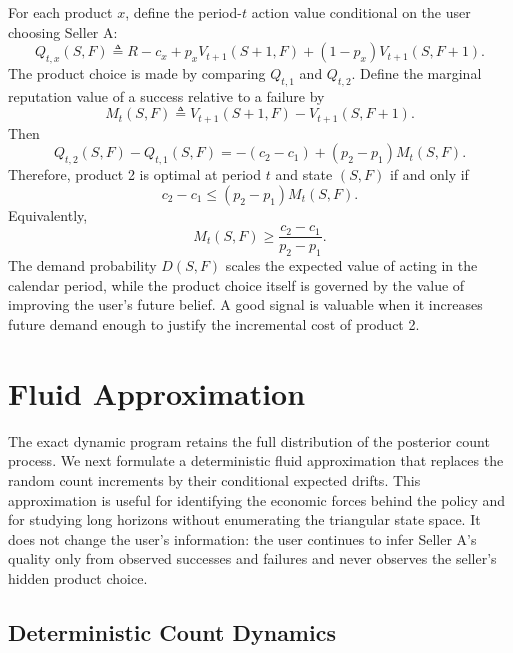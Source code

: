 \documentclass[opre]{informs3}
\begin{document}
For each product $x$, define the period-$t$ action value conditional on the user
choosing Seller A:
\begin{equation}
    Q_{t,x}(S,F)
    \triangleq
    R-c_x
    +p_xV_{t+1}(S+1,F)
    +(1-p_x)V_{t+1}(S,F+1).
    \label{eq:finite-action-value}
\end{equation}
The product choice is made by comparing $Q_{t,1}$ and $Q_{t,2}$. Define the
marginal reputation value of a success relative to a failure by
\begin{equation}
    M_t(S,F)
    \triangleq
    V_{t+1}(S+1,F)-V_{t+1}(S,F+1).
    \label{eq:marginal-reputation}
\end{equation}
Then
\begin{equation}
    Q_{t,2}(S,F)-Q_{t,1}(S,F)
    =
    -(c_2-c_1)+(p_2-p_1)M_t(S,F).
    \label{eq:q-gap}
\end{equation}
Therefore, product 2 is optimal at period $t$ and state $(S,F)$ if and only if
\begin{equation}
    c_2-c_1
    \leq
    (p_2-p_1)M_t(S,F).
    \label{eq:finite-threshold}
\end{equation}
Equivalently,
\begin{equation}
    M_t(S,F)
    \geq
    \frac{c_2-c_1}{p_2-p_1}.
    \label{eq:marginal-threshold}
\end{equation}
The demand probability $D(S,F)$ scales the expected value of acting in the
calendar period, while the product choice itself is governed by the value of
improving the user's future belief. A good signal is valuable when it increases
future demand enough to justify the incremental cost of product 2.

\section{Fluid Approximation}

The exact dynamic program retains the full distribution of the posterior count
process. We next formulate a deterministic fluid approximation that replaces
the random count increments by their conditional expected drifts. This
approximation is useful for identifying the economic forces behind the policy
and for studying long horizons without enumerating the triangular state space.
It does not change the user's information: the user continues to infer Seller
A's quality only from observed successes and failures and never observes the
seller's hidden product choice.

\subsection{Deterministic Count Dynamics}
\end{document}
